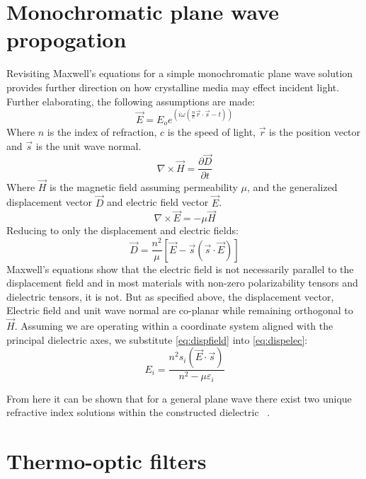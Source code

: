\section{Monochromatic plane wave propogation}
Revisiting Maxwell's equations for a simple monochromatic plane wave solution provides further direction on how crystalline media may effect incident light. Further elaborating, the following assumptions are made:
\begin{equation}
\vec{E} = E_o e^{(i \omega (\frac{n}{c} \vec{r}\cdot \vec{s}-t))}
\end{equation}
Where $n$ is the index of refraction, $c$ is the speed of light, $\vec{r}$ is the position vector and $\vec{s}$ is the unit wave normal.
\begin{equation}
\nabla \times \vec{H}= \frac{\partial \vec{D}}{\partial t}
\end{equation}
Where $\vec{H}$ is the magnetic field assuming permeability $\mu$, and the generalized displacement vector $\vec{D}$ and electric field vector $\vec{E}$.
\begin{equation}
\nabla \times \vec{E} = -\mu \vec{H}
\end{equation}
Reducing to only the displacement and electric fields:
\begin{equation}\label{eq:dispelec}
\vec{D} = \frac{n^2}{\mu}[\vec{E}-\vec{s}(\vec{s}\cdot \vec{E})]
\end{equation}
Maxwell's equations show that the electric field is not necessarily parallel to the displacement field and in most materials with non-zero polarizability tensors and dielectric tensors, it is not. But as specified above, the displacement vector, Electric field and unit wave normal are co-planar while remaining orthogonal to $\vec{H}$. Assuming we are operating within a coordinate system aligned with the principal dielectric axes, we substitute \autoref{eq:dispfield} into \autoref{eq:dispelec}:
\begin{equation}
E_i = \frac{n^2 s_i (\vec{E}\cdot\vec{s})}{n^2 - \mu \varepsilon_i}
\end{equation}

From here it can be shown that for a general plane wave there exist two unique refractive index solutions within the constructed dielectric ~\cite{nye}. 

\newpage

\section{Thermo-optic filters}\label{sec:TO_filt}

